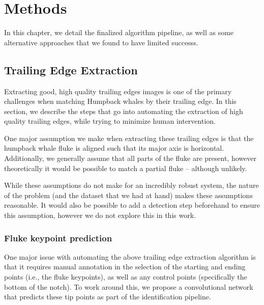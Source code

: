   
\chapter{Methods} \label{sec:methods}

In this chapter, we detail the finalized algorithm pipeline, as well as some alternative approaches that we found to have limited successs.

\section{Trailing Edge Extraction}

Extracting good, high quality trailing edges images is one of the primary challenges when matching Humpback whales by their trailing edge.
In this section, we describe the steps that go into automating the extraction of high quality trailing edges, while trying to minimize human intervention.

One major assumption we make when extracting these trailing edges is that the humpback whale fluke is aligned such that its major axis is horizontal.
Additionally, we generally assume that all parts of the fluke are present, however theoretically it would be possible to match a partial fluke -- although unlikely.

While these assumptions do not make for an incredibly robust system, the nature of the problem (and the dataset that we had at hand) makes these assumptions reasonable.
It would also be possible to add a detection step beforehand to ensure this assumption, however we do not explore this in this work.

\subsection{Fluke keypoint prediction}

One major issue with automating the above trailing edge extraction algorithm is that it requires manual annotation in the selection of the starting and ending points (i.e., the fluke keypoints), as well as any control points (specifically the bottom of the notch).
To work around this, we propose a convolutional network that predicts these tip points as part of the identification pipeline.

